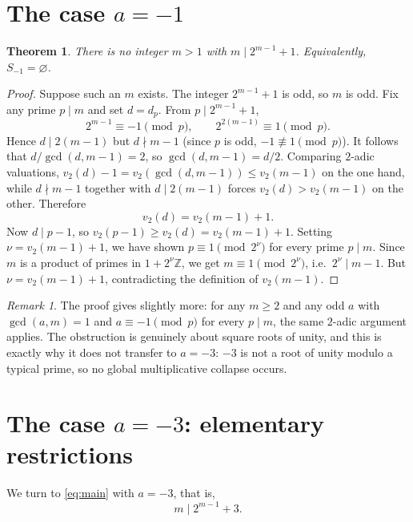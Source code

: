 \documentclass[11pt,reqno]{amsart}
\theoremstyle{plain}
\newtheorem{theorem}{Theorem}
\theoremstyle{definition}
\theoremstyle{remark}
\newtheorem{remark}{Remark}
\newcommand{\Z}{\mathbb{Z}}
\begin{document}
\section{The case \texorpdfstring{$a=-1$}{a=-1}}

\begin{theorem}\label{thm:minus1}
There is no integer $m>1$ with $m\mid 2^{m-1}+1$. Equivalently, $S_{-1}=\varnothing$.
\end{theorem}

\begin{proof}
Suppose such an $m$ exists. The integer $2^{m-1}+1$ is odd, so $m$ is odd. Fix any prime
$p\mid m$ and set $d=d_{p}$. From $p\mid 2^{m-1}+1$,
\[
2^{m-1}\equiv-1\pmod{p},\qquad 2^{2(m-1)}\equiv 1\pmod{p}.
\]
Hence $d\mid 2(m-1)$ but $d\nmid m-1$ (since $p$ is odd, $-1\not\equiv 1\pmod{p}$). It follows
that $d/\gcd(d,m-1)=2$, so $\gcd(d,m-1)=d/2$. Comparing $2$-adic valuations,
$v_{2}(d)-1=v_{2}(\gcd(d,m-1))\le v_{2}(m-1)$ on the one hand, while $d\nmid m-1$ together with
$d\mid 2(m-1)$ forces $v_{2}(d)>v_{2}(m-1)$ on the other. Therefore
\begin{equation}\label{eq:val}
v_{2}(d)=v_{2}(m-1)+1.
\end{equation}
Now $d\mid p-1$, so $v_{2}(p-1)\ge v_{2}(d)=v_{2}(m-1)+1$. Setting $\nu=v_{2}(m-1)+1$, we have
shown $p\equiv 1\pmod{2^{\nu}}$ for every prime $p\mid m$. Since $m$ is a product of primes in
$1+2^{\nu}\Z$, we get $m\equiv 1\pmod{2^{\nu}}$, i.e.\ $2^{\nu}\mid m-1$. But
$\nu=v_{2}(m-1)+1$, contradicting the definition of $v_{2}(m-1)$.
\end{proof}

\begin{remark}\label{rem:roots}
The proof gives slightly more: for any $m\ge 2$ and any odd $a$ with $\gcd(a,m)=1$ and
$a\equiv-1\pmod{p}$ for every $p\mid m$, the same $2$-adic argument applies. The obstruction is
genuinely about square roots of unity, and this is exactly why it does not transfer to $a=-3$:
$-3$ is not a root of unity modulo a typical prime, so no global multiplicative collapse occurs.
\end{remark}

\section{The case \texorpdfstring{$a=-3$}{a=-3}: elementary restrictions}

We turn to \eqref{eq:main} with $a=-3$, that is,
\begin{equation}\label{eq:star}\tag{$\star$}
m\mid 2^{m-1}+3.
\end{equation}
\end{document}
